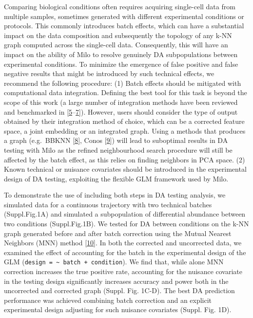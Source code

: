 \documentclass[
]{article}
\begin{document}
Comparing biological conditions often requires acquiring single-cell data from multiple samples, sometimes generated with different experimental conditions or protocols. This commonly introduces batch effects, which can have a substantial impact on the data composition and subsequently the topology of any k-NN graph computed across the single-cell data. Consequently, this will have an impact on the ability of Milo to resolve genuinely DA subpopulations between experimental conditions. To minimize the emergence of false positive and false negative results that might be introduced by such technical effects, we recommend the following procedure: (1) Batch effects should be mitigated with computational data integration. Defining the best tool for this task is beyond the scope of this work (a large number of integration methods have been reviewed and benchmarked in {[}\protect\hyperlink{ref-lueckenBenchmarkingAtlaslevelData2020}{5}--\protect\hyperlink{ref-tranBenchmarkBatcheffectCorrection2020}{7}{]}). However, users should consider the type of output obtained by their integration method of choice, which can be a corrected feature space, a joint embedding or an integrated graph. Using a methods that produces a graph (e.g.~BBKNN {[}\protect\hyperlink{ref-polanskiBBKNNFastBatch}{8}{]}, Conos {[}\protect\hyperlink{ref-barkasJointAnalysisHeterogeneous2019}{9}{]}) will lead to suboptimal results in DA testing with Milo as the refined neighbourhood search procedure will still be affected by the batch effect, as this relies on finding neighbors in PCA space. (2) Known technical or nuisance covariates should be introduced in the experimental design of DA testing, exploiting the flexible GLM framework used by Milo.

To demonstrate the use of including both steps in DA testing analysis, we simulated data for a continuous trajectory with two technical batches (Suppl.Fig.1A) and simulated a subpopulation of differential abundance between two conditions (Suppl.Fig.1B). We tested for DA between conditions on the k-NN graph generated before and after batch correction using the Mutual Nearest Neighbors (MNN) method {[}\protect\hyperlink{ref-haghverdiBatchEffectsSinglecell2018}{10}{]}. In both the corrected and uncorrected data, we examined the effect of accounting for the batch in the experimental design of the GLM (\texttt{design\ =\ \textasciitilde{}\ batch\ +\ condition}). We find that, while alone MNN correction increases the true positive rate, accounting for the nuisance covariate in the testing design significantly increases accuracy and power both in the uncorrected and corrected graph (Suppl. Fig. 1C-D). The best DA prediction performance was achieved combining batch correction and an explicit experimental design adjusting for such nuisance covariates (Suppl. Fig. 1D).
\end{document}
